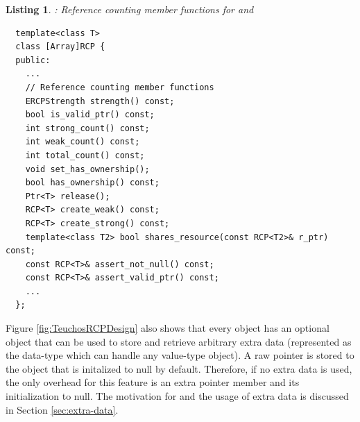 \documentclass[pdf,ps2pdf,11pt]{SANDreport}
\newtheorem{listing}{Listing}
\begin{document}
{}\begin{listing}: Reference counting member functions for {}
and {}
\label{listing:ref-count-mem-funcs}
{\small\begin{verbatim}
  template<class T>
  class [Array]RCP {
  public:
    ...
    // Reference counting member functions
    ERCPStrength strength() const;
    bool is_valid_ptr() const;
    int strong_count() const;
    int weak_count() const;
    int total_count() const;
    void set_has_ownership();
    bool has_ownership() const;
    Ptr<T> release();
    RCP<T> create_weak() const;
    RCP<T> create_strong() const;
    template<class T2> bool shares_resource(const RCP<T2>& r_ptr) const;
    const RCP<T>& assert_not_null() const;
    const RCP<T>& assert_valid_ptr() const;
    ...
  };
\end{verbatim}}
\end{listing}


Figure {}\ref{fig:TeuchosRCPDesign} also shows that every
{} object has an optional {} object
that can be used to store and retrieve arbitrary extra data
(represented as the {} data-type which can handle any
value-type object).  A raw pointer is stored to the
{} object that is initalized to null by
default.  Therefore, if no extra data is used, the only overhead for
this feature is an extra pointer member and its initialization to
null.  The motivation for and the usage of extra data is discussed in
Section {}\ref{sec:extra-data}.
\end{document}
